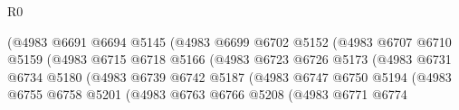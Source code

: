 \begin{lexlean}{R0}
\begin{coremodule}
                                            (@4983
                                              @6691
                                              @6694
                                              @5145
                                              (@4983
                                                @6699
                                                @6702
                                                @5152
                                                (@4983
                                                  @6707
                                                  @6710
                                                  @5159
                                                  (@4983
                                                    @6715
                                                    @6718
                                                    @5166
                                                    (@4983
                                                      @6723
                                                      @6726
                                                      @5173
                                                      (@4983
                                                        @6731
                                                        @6734
                                                        @5180
                                                        (@4983
                                                          @6739
                                                          @6742
                                                          @5187
                                                          (@4983
                                                            @6747
                                                            @6750
                                                            @5194
                                                            (@4983
                                                              @6755
                                                              @6758
                                                              @5201
                                                              (@4983
                                                                @6763
                                                                @6766
                                                                @5208
                                                                (@4983
                                                                  @6771
                                                                  @6774

\end{coremodule}
\end{lexlean}
